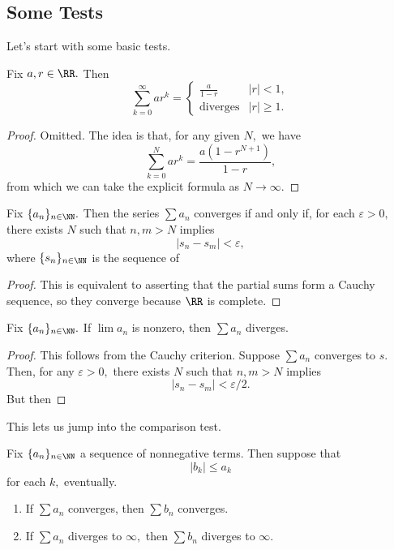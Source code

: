 \documentclass[../notes.tex]{subfiles}
\begin{document}
\subsection{Some Tests}
Let's start with some basic tests.
\begin{proposition}
	Fix $a,r\in\RR.$ Then
	\[\sum_{k=0}^\infty ar^k=\begin{cases}
		\frac a{1-r} & |r|<1, \\
		\text{diverges} & |r|\ge1.
	\end{cases}\]
\end{proposition}
\begin{proof}
	Omitted. The idea is that, for any given $N,$ we have
	\[\sum_{k=0}^Nar^k=\frac{a\left(1-r^{N+1}\right)}{1-r},\]
	from which we can take the explicit formula as $N\to\infty.$
\end{proof}
\begin{proposition}
	Fix $\{a_n\}_{n\in\NN}.$ Then the series $\sum a_n$ converges if and only if, for each $\varepsilon>0,$ there exists $N$ such that $n,m>N$ implies
	\[|s_n-s_m|<\varepsilon,\]
	where $\{s_n\}_{n\in\NN}$ is the sequence of 
\end{proposition}
\begin{proof}
	This is equivalent to asserting that the partial sums form a Cauchy sequence, so they converge because $\RR$ is complete.
\end{proof}
\begin{proposition}
	Fix $\{a_n\}_{n\in\NN}.$ If $\lim a_n$ is nonzero, then $\sum a_n$ diverges.
\end{proposition}
\begin{proof}
	This follows from the Cauchy criterion. Suppose $\sum a_n$ converges to $s.$ Then, for any $\varepsilon>0,$ there exists $N$ such that $n,m>N$ implies
	\[|s_n-s_m|<\varepsilon/2.\]
	But then \todo{}
\end{proof}
This lets us jump into the comparison test.
\begin{prop}
	Fix $\{a_n\}_{n\in\NN}$ a sequence of nonnegative terms. Then suppose that
	\[|b_k|\le a_k\]
	for each $k,$ eventually.
	\begin{enumerate}[label=(\alph*)]
		\item If $\sum a_n$ converges, then $\sum b_n$ converges.
		\item If $\sum a_n$ diverges to $\infty,$ then $\sum b_n$ diverges to $\infty.$
	\end{enumerate}
\end{prop}
\end{document}

